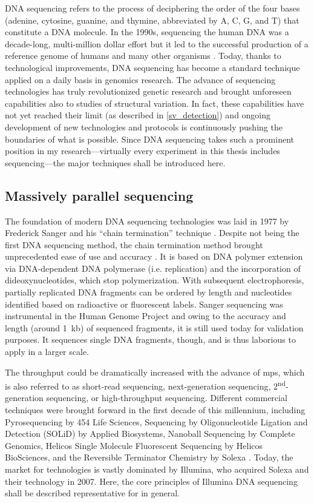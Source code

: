 DNA sequencing refers to the process of deciphering the order of the four bases
(adenine, cytosine, guanine, and thymine, abbreviated by A, C, G, and T) that
constitute a DNA molecule. In the 1990s, sequencing the human DNA was a
decade-long, multi-million dollar effort but it led to the successful production
of a reference genome of humans and many other organisms
\citep{Lander2001,Venter2001}. Today, thanks to technological improvements,
DNA sequencing has become a standard technique applied on a daily basis in
genomics research. The advance of sequencing technologies has truly
revolutionized genetic research and brought unforeseen capabilities also to
studies of structural variation. In fact, these capabilities have not yet
reached their limit (as described in \cref{sv_detection}) and ongoing
development of new technologies and protocols is continuously pushing the
boundaries of what is possible. Since DNA sequencing takes such a prominent
position in my research---virtually every experiment in this thesis includes
sequencing---the major techniques shall be introduced here.




\subsection{Massively parallel sequencing}
\label{sec:mps}

The foundation of modern DNA sequencing technologies was laid in 1977 by Frederick Sanger
and his ``chain termination'' technique \citep{Sanger1977}. Despite not being
the first DNA sequencing method, the chain termination method brought
unprecedented ease of use and accuracy \citep{Heather2016}. It is based on DNA
polymer extension via DNA-dependent DNA polymerase (i.e. replication) and the
incorporation of dideoxynucleotides, which stop polymerization. With subsequent
electrophoresis, partially replicated DNA fragments can be ordered by length and
nucleotides identified based on radioactive or fluorescent labels.
Sanger sequencing was instrumental in the Human Genome Project and owing to the
accuracy and length (around 1~kb) of sequenced fragments, it is still used
today for validation purposes. It sequences single DNA fragments, though, and
is thus laborious to apply in a larger scale.

The throughput could be dramatically increased with the advance of \acf{mps},
which is also referred to as short-read sequencing, next-generation sequencing,
2\textsuperscript{nd}-generation sequencing, or high-throughput sequencing.
Different commercial techniques were brought forward in the first decade of this
millennium, including Pyrosequencing by 454 Life Sciences, Sequencing by
Oligonucleotide Ligation and Detection (SOLiD) by Applied Biosystems,
Nanoball Sequencing by Complete Genomics, Helicos Single Molecule Fluorescent
Sequencing by Helicos BioSciences, and the Reversible Terminator Chemistry by
Solexa \citep{wikiDNAseq2018}. Today, the market for \mps technologies is vastly
dominated by Illumina, who acquired Solexa and their technology in 2007. Here,
the core principles of Illumina DNA sequencing shall be described representative
for \mps in general.

